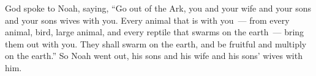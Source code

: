 \begin{inparaenum}
     God spoke to Noah, saying,%
     ``Go out of the Ark, you and your wife and your sons and your sons wives with you.%
     Every animal that is with you~--- from every animal, bird, large animal, and every reptile that swarms on the earth~--- bring them out with you. They shall swarm on the earth, and be fruitful and multiply on the earth.''%
     So Noah went out, his sons and his wife and his sons' wives with him.%
    
\end{inparaenum}

